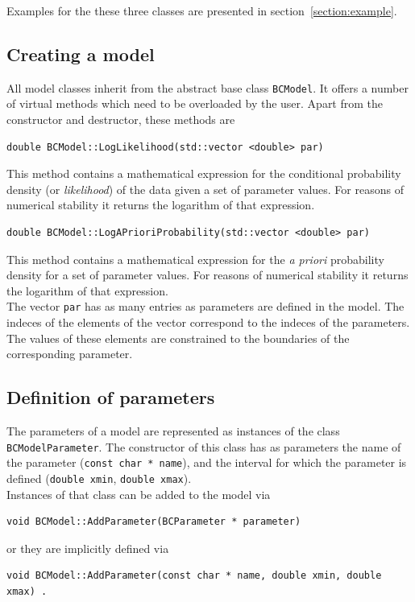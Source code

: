 \documentclass[11pt, a4paper]{article}
\begin{document}
\noindent
Examples for the these three classes are presented in
section~\ref{section:example}.

\subsection{Creating a model}

All model classes inherit from the abstract base class
\verb|BCModel|. It offers a number of virtual methods which need to be
overloaded by the user. Apart from the constructor and destructor,
these methods are
%
\begin{verbatim}
double BCModel::LogLikelihood(std::vector <double> par)
\end{verbatim}

\noindent
This method contains a mathematical expression for the conditional
probability density (or {\it likelihood}) of the data given a set of
parameter values. For reasons of numerical stability it returns the
logarithm of that expression. \\

\begin{verbatim}
double BCModel::LogAPrioriProbability(std::vector <double> par)
\end{verbatim}
%
\noindent
This method contains a mathematical expression for the {\it a priori}
probability density for a set of parameter values. For reasons of
numerical stability it returns the logarithm of that expression. \\

\noindent
The vector \verb|par| has as many entries as parameters are defined in
the model. The indeces of the elements of the vector correspond to the
indeces of the parameters. The values of these elements are
constrained to the boundaries of the corresponding parameter.

\subsection{Definition of parameters}

The parameters of a model are represented as instances of the class
\verb|BCModelParameter|. The constructor of this class has as
parameters the name of the parameter (\verb|const char * name|), and
the interval for which the parameter is defined (\verb|double xmin|,
\verb|double xmax|). \\ 

Instances of that class can be added to the model via 
%
\begin{verbatim}
void BCModel::AddParameter(BCParameter * parameter) 
\end{verbatim}
%
\noindent 
or they are implicitly defined via 
%
\begin{verbatim}
void BCModel::AddParameter(const char * name, double xmin, double xmax) . 
\end{verbatim}
\end{document}
